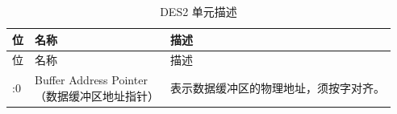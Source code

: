 \begin{longtable}[c]{ |p{3cm}|p{4cm}|p{8cm}| }
\caption{DES2 单元描述} \label{tab:sdhost-DES2}\\
\hline
\rowcolor{lightgray}
位 &名称 & 描述\\
\hline
\endfirsthead
\hline
\rowcolor{lightgray}
位 &名称 & 描述 \\
\hline
\endhead
\endfoot
31:0 &\makecell[l]{Buffer Address Pointer\\（数据缓冲区地址指针）}& 表示数据缓冲区的物理地址，须按字对齐。\\\hline
\end{longtable}